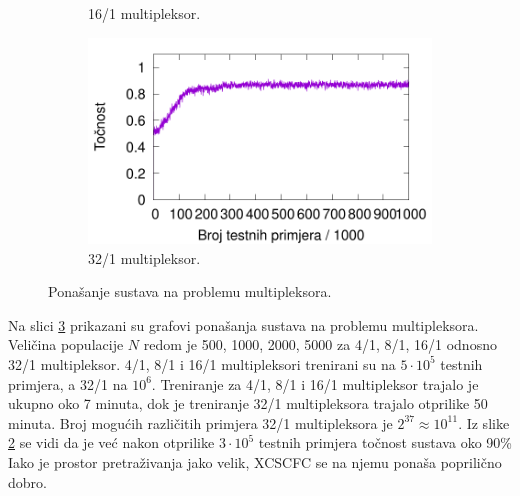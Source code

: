 \documentclass[times, utf8, zavrsni]{fer}
\begin{document}
\begin{figure}[h]
\begin{subfigure}{0.496\textwidth}
        \caption{16/1 multipleksor.}
        \label{fig:20muxre}
    \end{subfigure}
    \begin{subfigure}{0.496\textwidth}
        \centering
        \includegraphics[width=\textwidth]{img/multiplexer/37muxre.pdf}
        \caption{32/1 multipleksor.}
        \label{fig:37muxre}
    \end{subfigure}
    \caption{Ponašanje sustava na problemu multipleksora.}
    \label{fig:muxre}
\end{figure}
Na slici \ref{fig:muxre} prikazani su grafovi ponašanja sustava na problemu multipleksora.
Veličina populacije $N$ redom je 500, 1000, 2000, 5000 za 4/1, 8/1, 16/1 odnosno 32/1 multipleksor.
4/1, 8/1 i 16/1 multipleksori trenirani su na $5 \cdot 10^{5}$ testnih primjera, a 32/1 na $10^{6}$.
Treniranje za 4/1, 8/1 i 16/1 multipleksor trajalo je ukupno oko 7 minuta, dok je treniranje 32/1 multipleksora trajalo otprilike 50 minuta.
Broj mogućih različitih primjera 32/1 multipleksora je $2^{37} \approx 10^{11}$.
Iz slike \ref{fig:37muxre} se vidi da je već nakon otprilike $3 \cdot 10^{5}$ testnih primjera točnost sustava oko 90\%
Iako je prostor pretraživanja jako velik, XCSCFC se na njemu ponaša poprilično dobro.
\end{document}
